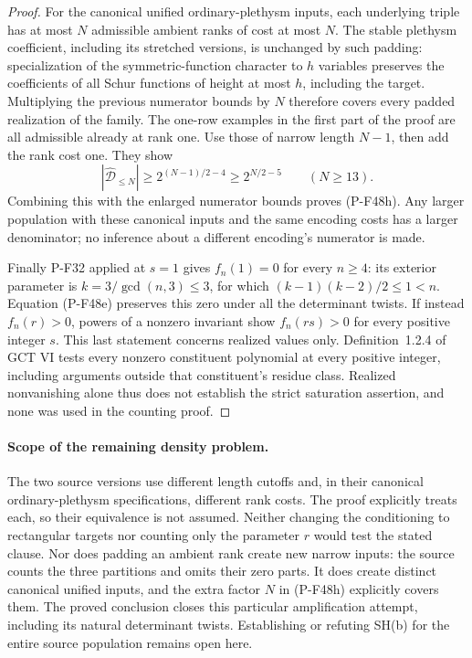 \begin{proof}
For the canonical unified ordinary-plethysm inputs,
each underlying triple has at most $N$ admissible
ambient ranks of cost at most $N$.
The stable plethysm coefficient, including its stretched
versions, is unchanged by such padding: specialization
of the symmetric-function character to $h$ variables
preserves the coefficients of all Schur functions of
height at most $h$, including the target.
Multiplying the previous numerator bounds by $N$
therefore covers every padded realization of the family.
The one-row examples in the first part of the proof
are all admissible already at rank one.
Use those of narrow length $N-1$, then add the rank
cost one. They show
\[
        |\widehat{\mathcal D}_{\le N}|
                  \ge 2^{(N-1)/2-4}
                  \ge 2^{N/2-5}
                         \qquad(N\ge13).
\]
Combining this with the enlarged numerator bounds
proves (P-F48h). Any larger population with these
canonical inputs and the same encoding costs has a
larger denominator; no inference about a different
encoding's numerator is made.

Finally P-F32 applied at $s=1$ gives
$f_n(1)=0$ for every $n\ge4$: its exterior parameter
is $k=3/\gcd(n,3)\le3$, for which
$(k-1)(k-2)/2\le1<n$.
Equation (P-F48e) preserves this zero under all the
determinant twists.
If instead $f_n(r)>0$, powers of a nonzero invariant
show $f_n(rs)>0$ for every positive integer $s$.
This last statement concerns realized values only.
Definition~1.2.4 of GCT VI tests every nonzero
constituent polynomial at every positive integer,
including arguments outside that constituent's
residue class. Realized nonvanishing alone thus
does not establish the strict saturation assertion,
and none was used in the counting proof.
\end{proof}

\paragraph{Scope of the remaining density problem.}
The two source versions use different length cutoffs
and, in their canonical ordinary-plethysm specifications,
different rank costs. The proof explicitly treats
each, so their equivalence is not assumed.
Neither changing the conditioning to
rectangular targets nor counting only the parameter
$r$ would test the stated clause. Nor does padding an
ambient rank create new narrow inputs: the source
counts the three partitions and omits their zero parts.
It does create distinct canonical unified inputs,
and the extra factor $N$ in (P-F48h) explicitly covers
them.
The proved conclusion closes this particular
amplification attempt, including its natural determinant
twists. Establishing or refuting SH(b) for the entire
source population remains open here.

